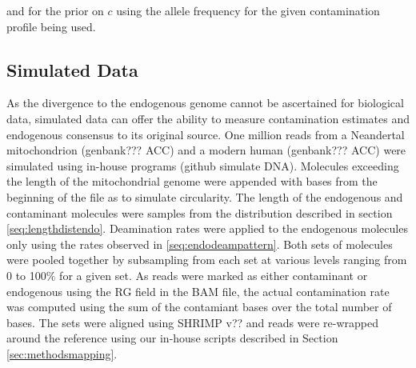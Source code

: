 \documentclass[a4paper,12pt]{article}
\begin{document}
\noindent  and for the prior on $c$ using the allele frequency for the given contamination profile being used. 





\subsection{Simulated Data}

As the divergence to the endogenous genome cannot be ascertained for biological data, simulated data can offer the ability to measure contamination estimates and endogenous consensus to its original source. One million reads from a Neandertal mitochondrion (genbank??? ACC) and a modern human (genbank??? ACC) were simulated using in-house programs (github simulate DNA). Molecules exceeding the length of the mitochondrial genome were appended with bases from the beginning of the file as to simulate circularity. The length of the endogenous and contaminant molecules were samples from the distribution described in section \ref{seq:lengthdistendo}. Deamination rates were applied to the endogenous molecules only using the rates observed in \ref{seq:endodeampattern}. %
Both sets of molecules were pooled together by subsampling from each set at various levels ranging from 0 to 100\% for a given set. As reads were marked as either contaminant or endogenous using the RG field in the BAM file, the actual contamination rate was computed using the sum of the contamiant bases over the total number of bases. The sets were aligned using SHRIMP v?? and reads were re-wrapped around the reference using our in-house scripts described in Section \ref{sec:methodsmapping}. 
\end{document}
